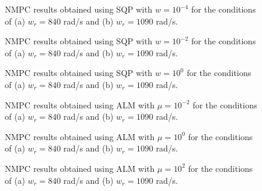 \documentclass[journal]{IEEEtranTIE}
\begin{document}
\begin{figure}[!t]
\centering
{}
\vfill
{}
\caption{NMPC results obtained using SQP with $w = 10^{-4}$ for the conditions of (a) $w_r = 840$ rad/s  and (b) $w_r = 1090$ rad/s.
}\label{Fig1}
\end{figure}

\begin{figure}[!t]
\centering
{}
\vfill
{}
\caption{NMPC results obtained using SQP with $w = 10^{-2}$ for the conditions of (a) $w_r = 840$ rad/s  and (b) $w_r = 1090$ rad/s.
}\label{Fig2}
\end{figure}

\begin{figure}[!t]
\centering
{}
\vfill
{}
\caption{NMPC results obtained using SQP with $w = 10^{0}$ for the conditions of (a) $w_r = 840$ rad/s  and (b) $w_r = 1090$ rad/s.
}\label{Fig3}
\end{figure}

\begin{figure}[!t]
\centering
{}
\vfill
{}
\caption{NMPC results obtained using ALM with $\mu = 10^{-2}$ for the conditions of (a) $w_r = 840$ rad/s  and (b) $w_r = 1090$ rad/s.
}\label{Fig4}
\end{figure}

\begin{figure}[!t]
\centering
{}
\vfill
{}
\caption{NMPC results obtained using ALM with $\mu = 10^{0}$ for the conditions of (a) $w_r = 840$ rad/s  and (b) $w_r = 1090$ rad/s.
}\label{Fig5}
\end{figure}

\begin{figure}[!t]
\centering
{}
\vfill
{}
\caption{NMPC results obtained using ALM with $\mu = 10^{2}$ for the conditions of (a) $w_r = 840$ rad/s  and (b) $w_r = 1090$ rad/s.
}\label{Fig6}
\end{figure}
\end{document}
